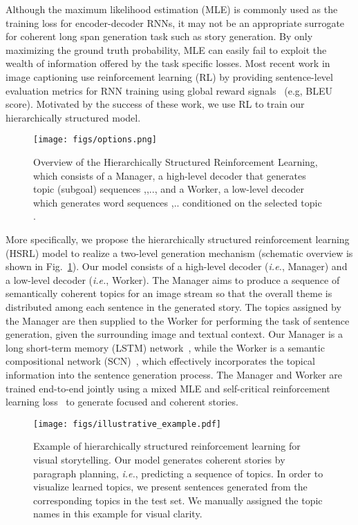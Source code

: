 \documentclass[letterpaper]{article} \usepackage{aaai19}  \usepackage{times}  \usepackage{helvet}  \usepackage{courier}  \usepackage{url}  \usepackage{graphicx}
\begin{document}
Although the maximum likelihood estimation (MLE) is commonly used as the training loss for encoder-decoder RNNs, it may not be an appropriate surrogate for coherent long span generation task such as story generation. By only maximizing the ground truth probability, MLE can easily fail to exploit the wealth of information offered by the task specific losses. Most recent work in image captioning use reinforcement learning (RL) by providing sentence-level evaluation metrics for RNN training using global reward signals~\cite{Rennie2016Self,ren2017deep,liu2016improved} (e.g, BLEU score). Motivated by the success of these work, we use RL to train our hierarchically structured model.

\begin{figure}[t]
	\centering
	\texttt{[image: figs/options.png]}
	\caption{\small Overview of the Hierarchically Structured Reinforcement Learning, which consists of a Manager, a high-level decoder that generates topic (subgoal) sequences {,,..}, and a Worker, a low-level decoder which generates word sequences ,.. conditioned on the selected topic .}
	\label{fig:overview_hrl_agent}	
\end{figure}

More specifically, we propose the hierarchically structured reinforcement learning (HSRL) model to realize a two-level generation mechanism (schematic overview is shown in Fig.~\ref{fig:overview_hrl_agent}). Our model consists of a high-level decoder (\emph{i.e.}, Manager) and a low-level decoder (\emph{i.e.}, Worker). The Manager aims to produce a sequence of semantically coherent topics for an image stream so that the overall theme is distributed among each sentence in the generated story. The topics assigned by the Manager are then supplied to the Worker for performing the task of sentence generation, given the surrounding image and textual context. Our Manager is a long short-term memory (LSTM) network~\cite{hochreiter1997long}, while the Worker is a semantic compositional network (SCN)~\cite{SCN_CVPR2017}, which effectively incorporates the topical information into the sentence generation process. The Manager and Worker are trained end-to-end jointly using a mixed MLE and self-critical reinforcement learning loss~\cite{Rennie2016Self} to generate focused and coherent stories. 

\begin{figure*}[t!]
	\centering
	\texttt{[image: figs/illustrative\_example.pdf]}
	\caption{Example of hierarchically structured reinforcement learning for visual storytelling. Our model generates coherent stories by paragraph planning, \emph{i.e.}, predicting a sequence of topics. In order to visualize learned topics, we present sentences generated from the corresponding topics in the test set. We manually assigned the topic names in this example for visual clarity.
		\small }
	\vspace{-1mm}
	\label{fig:framework}
\end{figure*}
\end{document}
